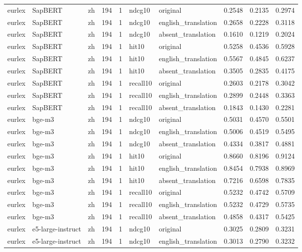 \begin{tabular}{lllrrllrrr}
eurlex & SapBERT & zh & 194 & 1 & ndcg10 & original & 0.2548 & 0.2135 & 0.2974 \\
eurlex & SapBERT & zh & 194 & 1 & ndcg10 & english\_translation & 0.2658 & 0.2228 & 0.3118 \\
eurlex & SapBERT & zh & 194 & 1 & ndcg10 & absent\_translation & 0.1610 & 0.1219 & 0.2024 \\
eurlex & SapBERT & zh & 194 & 1 & hit10 & original & 0.5258 & 0.4536 & 0.5928 \\
eurlex & SapBERT & zh & 194 & 1 & hit10 & english\_translation & 0.5567 & 0.4845 & 0.6237 \\
eurlex & SapBERT & zh & 194 & 1 & hit10 & absent\_translation & 0.3505 & 0.2835 & 0.4175 \\
eurlex & SapBERT & zh & 194 & 1 & recall10 & original & 0.2603 & 0.2178 & 0.3042 \\
eurlex & SapBERT & zh & 194 & 1 & recall10 & english\_translation & 0.2899 & 0.2448 & 0.3363 \\
eurlex & SapBERT & zh & 194 & 1 & recall10 & absent\_translation & 0.1843 & 0.1430 & 0.2281 \\
eurlex & bge-m3 & zh & 194 & 1 & ndcg10 & original & 0.5031 & 0.4570 & 0.5501 \\
eurlex & bge-m3 & zh & 194 & 1 & ndcg10 & english\_translation & 0.5006 & 0.4519 & 0.5495 \\
eurlex & bge-m3 & zh & 194 & 1 & ndcg10 & absent\_translation & 0.4334 & 0.3817 & 0.4881 \\
eurlex & bge-m3 & zh & 194 & 1 & hit10 & original & 0.8660 & 0.8196 & 0.9124 \\
eurlex & bge-m3 & zh & 194 & 1 & hit10 & english\_translation & 0.8454 & 0.7938 & 0.8969 \\
eurlex & bge-m3 & zh & 194 & 1 & hit10 & absent\_translation & 0.7216 & 0.6598 & 0.7835 \\
eurlex & bge-m3 & zh & 194 & 1 & recall10 & original & 0.5232 & 0.4742 & 0.5709 \\
eurlex & bge-m3 & zh & 194 & 1 & recall10 & english\_translation & 0.5232 & 0.4729 & 0.5735 \\
eurlex & bge-m3 & zh & 194 & 1 & recall10 & absent\_translation & 0.4858 & 0.4317 & 0.5425 \\
eurlex & e5-large-instruct & zh & 194 & 1 & ndcg10 & original & 0.3025 & 0.2809 & 0.3231 \\
eurlex & e5-large-instruct & zh & 194 & 1 & ndcg10 & english\_translation & 0.3013 & 0.2790 & 0.3232 \\

\end{tabular}
